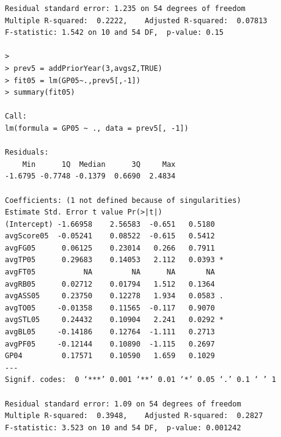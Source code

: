 \documentclass[]{scrartcl}
\begin{document}
\begin{verbatim}
Residual standard error: 1.235 on 54 degrees of freedom
Multiple R-squared:  0.2222,	Adjusted R-squared:  0.07813 
F-statistic: 1.542 on 10 and 54 DF,  p-value: 0.15

> 
> prev5 = addPriorYear(3,avgsZ,TRUE)
> fit05 = lm(GP05~.,prev5[,-1])
> summary(fit05)

Call:
lm(formula = GP05 ~ ., data = prev5[, -1])

Residuals:
    Min      1Q  Median      3Q     Max 
-1.6795 -0.7748 -0.1379  0.6690  2.4834 

Coefficients: (1 not defined because of singularities)
Estimate Std. Error t value Pr(>|t|)  
(Intercept) -1.66958    2.56583  -0.651   0.5180  
avgScore05  -0.05241    0.08522  -0.615   0.5412  
avgFG05      0.06125    0.23014   0.266   0.7911  
avgTP05      0.29683    0.14053   2.112   0.0393 *
avgFT05           NA         NA      NA       NA  
avgRB05      0.02712    0.01794   1.512   0.1364  
avgASS05     0.23750    0.12278   1.934   0.0583 .
avgTO05     -0.01358    0.11565  -0.117   0.9070  
avgSTL05     0.24432    0.10904   2.241   0.0292 *
avgBL05     -0.14186    0.12764  -1.111   0.2713  
avgPF05     -0.12144    0.10890  -1.115   0.2697  
GP04         0.17571    0.10590   1.659   0.1029  
---
Signif. codes:  0 ‘***’ 0.001 ‘**’ 0.01 ‘*’ 0.05 ‘.’ 0.1 ‘ ’ 1

Residual standard error: 1.09 on 54 degrees of freedom
Multiple R-squared:  0.3948,	Adjusted R-squared:  0.2827 
F-statistic: 3.523 on 10 and 54 DF,  p-value: 0.001242
\end{verbatim}
\end{document}
